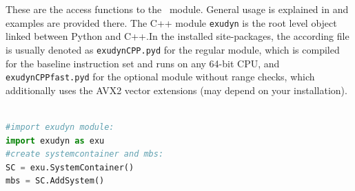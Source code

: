 \mysubsection{\codeName}



These are the access functions to the \codeName\ module. General usage is explained in  and examples are provided there. The C++ module \texttt{exudyn} is the root level object linked between Python and C++.In the installed site-packages, the according file is usually denoted as \texttt{exudynCPP.pyd} for the regular module, which is compiled for the baseline instruction set and runs on any 64-bit CPU, and \texttt{exudynCPPfast.pyd} for the optional module without range checks, which additionally uses the AVX2 vector extensions (may depend on your installation).
\pythonstyle
\begin{lstlisting}[language=Python, firstnumber=1]

#import exudyn module:
import exudyn as exu
#create systemcontainer and mbs:
SC = exu.SystemContainer()
mbs = SC.AddSystem()
\end{lstlisting}

